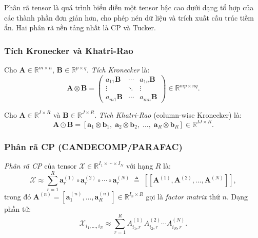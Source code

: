 Phân rã tensor là quá trình biểu diễn một tensor bậc cao dưới dạng tổ hợp của các thành phần đơn giản hơn, cho phép nén dữ liệu và trích xuất cấu trúc tiềm ẩn. Hai phân rã nền tảng nhất là CP và Tucker.

\subsubsection{Tích Kronecker và Khatri-Rao}

\begin{definition}
Cho $\mathbf{A} \in \mathbb{R}^{m \times n}$, $\mathbf{B} \in \mathbb{R}^{p \times q}$. \textit{Tích Kronecker} là:
\begin{equation}
    \mathbf{A} \otimes \mathbf{B} =
    \begin{pmatrix}
        a_{11}\mathbf{B} & \cdots & a_{1n}\mathbf{B} \\
        \vdots & \ddots & \vdots \\
        a_{m1}\mathbf{B} & \cdots & a_{mn}\mathbf{B}
    \end{pmatrix} \in \mathbb{R}^{mp \times nq}.
\end{equation}
\end{definition}

\begin{definition}
Cho $\mathbf{A} \in \mathbb{R}^{I \times R}$ và $\mathbf{B} \in \mathbb{R}^{J \times R}$. \textit{Tích Khatri-Rao} (column-wise Kronecker) là:
\begin{equation}
    \mathbf{A} \odot \mathbf{B} = [\mathbf{a}_1 \otimes \mathbf{b}_1,\; \mathbf{a}_2 \otimes \mathbf{b}_2,\; \ldots,\; \mathbf{a}_R \otimes \mathbf{b}_R] \in \mathbb{R}^{IJ \times R}.
\end{equation}
\end{definition}

\subsubsection{Phân rã CP (CANDECOMP/PARAFAC)}

\begin{definition}[Phân rã CP]
\textit{Phân rã CP} \cite{harshman1970foundations, carroll1970analysis} của tensor $\mathcal{X} \in \mathbb{R}^{I_1 \times \cdots \times I_N}$ với hạng $R$ là:
\begin{equation}
    \mathcal{X} \approx \sum_{r=1}^{R} \mathbf{a}^{(1)}_r \circ \mathbf{a}^{(2)}_r \circ \cdots \circ \mathbf{a}^{(N)}_r
    \;\triangleq\; [\![\mathbf{A}^{(1)}, \mathbf{A}^{(2)}, \ldots, \mathbf{A}^{(N)}]\!],
\end{equation}
trong đó $\mathbf{A}^{(n)} = [\mathbf{a}^{(n)}_1, \ldots, \mathbf{a}^{(n)}_R] \in \mathbb{R}^{I_n \times R}$ gọi là \textit{factor matrix} thứ $n$. Dạng phần tử:
\begin{equation}
    \mathcal{X}_{i_1,\ldots,i_N} \approx \sum_{r=1}^{R} A^{(1)}_{i_1,r} A^{(2)}_{i_2,r} \cdots A^{(N)}_{i_N,r}.
\end{equation}
\end{definition}

